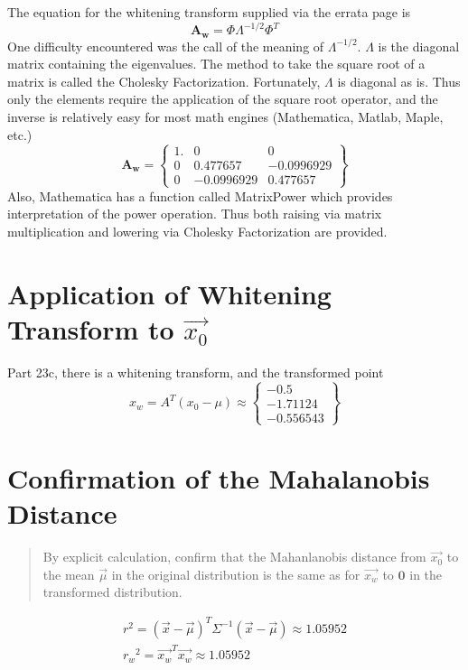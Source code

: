 \documentclass[11pt]{article}
\begin{document}
The equation for the whitening transform supplied via the errata page is 
\begin{equation}
	\mathbf{A_w} = \Phi \Lambda^{-1/2} \Phi ^T
\end{equation}
One difficulty encountered was the call of the meaning of $\Lambda^{-1/2}$.  $\Lambda$ is the diagonal matrix containing the eigenvalues.  The method to take the square root of a matrix is called the Cholesky Factorization. Fortunately, $\Lambda$ is diagonal as is.   Thus only the elements require the application of the square root operator, and the inverse is relatively easy for most math engines (Mathematica, Matlab, Maple, etc.)
\begin{equation}
	\mathbf{A_w} = 
	\left\{
	\begin{array}{lll}
	1.& 0 & 0 \\
	0 & 0.477657 & -0.0996929 \\
	0 & -0.0996929 & 0.477657
	\end{array}
		\right\}
\end{equation}
Also, Mathematica has a function called MatrixPower which provides interpretation of the power operation.  Thus both raising via matrix multiplication and lowering via Cholesky Factorization are provided.   




\section{Application of Whitening Transform to $\vec{x_0}$}
Part 23c, there is a whitening transform, and the transformed point 
\[
x_w = A^T (x_0 - \mu) \approx
\left\{
\begin{array}{l}
	-0.5 \\
	-1.71124 \\
	-0.556543
\end{array}
	\right\}
\]



\section{Confirmation of the Mahalanobis Distance}
\begin{quote}
By explicit calculation, confirm that the Mahanlanobis distance from $\vec{x_0}$ to the mean $\vec{\mu}$ in the original distribution is the same as for $\vec{x_w}$ to $\mathbf{0}$ in the transformed distribution. 
\end{quote}

\begin{eqnarray}
r^2 = (\vec{x} - \vec{\mu})^T \Sigma^{-1} (\vec{x} - \vec{\mu}) \approx 1.05952\\
{r_w}^2 = \vec{x_w} ^T  \vec{x_w} \approx 1.05952
\end{eqnarray}
\end{document}
